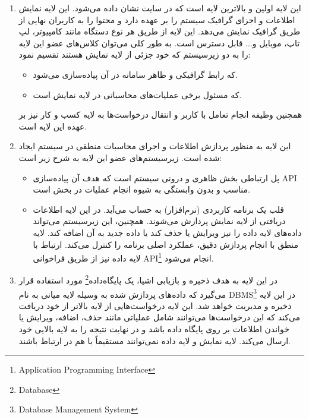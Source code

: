 \documentclass[12pt]{article}
\begin{document}
	\begin{enumerate}
	\item {}
	این لایه اولین و بالاترین لایه است که در سایت نشان داده می‌شود. این لایه نمایش اطلاعات و اجزای گرافیک سیستم را بر عهده دارد و محتوا را به کاربران نهایی از طریق گرافیک نمایش می‌دهد. این لایه از طریق هر نوع دستگاه مانند کامپیوتر، لپ تاپ، موبایل و... قابل دسترس است. به طور کلی می‌توان کلاس‌های عضو این لایه را به دو زیرسیستم که خود جزئی از لایه نمایش هستند تقسیم نمود:

	\begin{itemize}
		\item {}
	که رابط گرافیکی و ظاهر سامانه در آن پیاده‌سازی می‌شود.
		\item {}
		که مسئول برخی عملیات‌های محاسباتی در لایه نمایش است.
	\end{itemize}
	همچنین وظیفه انجام تعامل با کاربر و انتقال درخواست‌ها به لایه کسب و کار نیز بر عهده این لایه است.

	\item {}
	این لایه به منظور پردازش اطلاعات و اجرای محاسبات منطقی در سیستم ایجاد شده است. زیرسیستم‌های عضو این لایه به شرح زیر است:

	\begin{itemize}
		\item {}
	پل ارتباطی بخش ظاهری و درونی سیستم است که هدف آن پیاده‌سازی API مناسب و بدون وابستگی به شیوه انجام عملیات در بخش
	  است.

		\item {}
		 قلب یک برنامه کاربردی (نرم‌افزار) به حساب می‌آید. در این لایه اطلاعات دریافتی از لایه نمایش پردازش می‌شوند. همچنین، این زیرسیستم می‌تواند داده‌های لایه داده را نیز ویرایش یا حذف کند یا داده جدید به آن اضافه کند. لایه منطق با انجام پردازش دقیق، عملکرد اصلی برنامه را کنترل می‌کند. ارتباط با لایه داده نیز از طریق فراخوانی API\footnote{Application Programming Interface} انجام می‌شود.
	\end{itemize}

	\item {}
	در این لایه به هدف ذخیره و بازیابی اشیا، یک پایگاه‌داده\footnote{Database} مورد استفاده قرار می‌گیرد که داده‌های پردازش شده به وسيله لایه میانی به نام DBMS\footnote{Database Management System} در این لایه ذخیره و مدیریت خواهد شد. این لایه درخواست‌هایی از لایه بالاتر از خود دریافت می‌کند که این درخواست‌ها می‌توانند شامل عملیاتی مانند حذف، اضافه، ویرایش یا خواندن اطلاعات بر روی پایگاه داده باشد و در نهایت نتیجه را به لایه بالایی خود ارسال می‌کند. لایه نمایش و لایه داده نمی‌توانند مستقیماً با هم در ارتباط باشند.


\end{enumerate}
\end{document}
